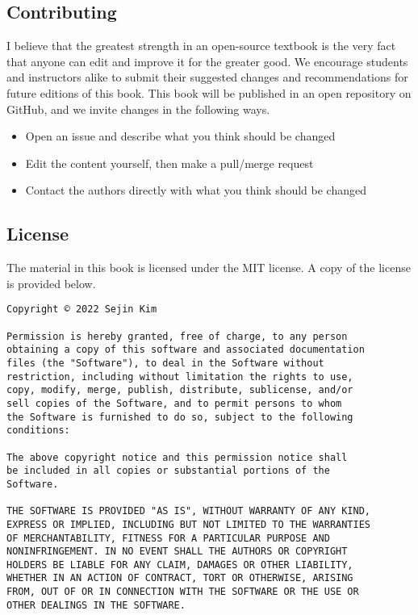 \subsection*{Contributing}
I believe that the greatest strength in an open-source textbook is the very fact that anyone can edit and improve it for the greater good. We encourage students and instructors alike to submit their suggested changes and recommendations for future editions of this book. This book will be published in an open repository on GitHub, and we invite changes in the following ways.
\begin{itemize}
    \item {Open an issue and describe what you think should be changed}
    \item {Edit the content yourself, then make a pull/merge request}
    \item {Contact the authors directly with what you think should be changed}
\end{itemize}
\subsection*{License}
The material in this book is licensed under the MIT license. A copy of the license is provided below.\par

\begin{verbatim}
Copyright © 2022 Sejin Kim

Permission is hereby granted, free of charge, to any person
obtaining a copy of this software and associated documentation
files (the "Software"), to deal in the Software without
restriction, including without limitation the rights to use,
copy, modify, merge, publish, distribute, sublicense, and/or
sell copies of the Software, and to permit persons to whom
the Software is furnished to do so, subject to the following
conditions:

The above copyright notice and this permission notice shall
be included in all copies or substantial portions of the
Software.

THE SOFTWARE IS PROVIDED "AS IS", WITHOUT WARRANTY OF ANY KIND,
EXPRESS OR IMPLIED, INCLUDING BUT NOT LIMITED TO THE WARRANTIES
OF MERCHANTABILITY, FITNESS FOR A PARTICULAR PURPOSE AND
NONINFRINGEMENT. IN NO EVENT SHALL THE AUTHORS OR COPYRIGHT
HOLDERS BE LIABLE FOR ANY CLAIM, DAMAGES OR OTHER LIABILITY,
WHETHER IN AN ACTION OF CONTRACT, TORT OR OTHERWISE, ARISING
FROM, OUT OF OR IN CONNECTION WITH THE SOFTWARE OR THE USE OR
OTHER DEALINGS IN THE SOFTWARE.
\end{verbatim}
